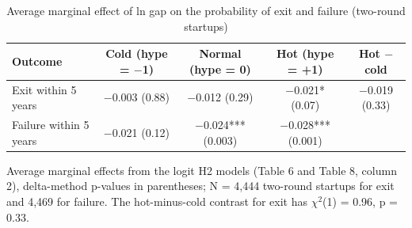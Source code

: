 \begin{table}[tbp]
\centering\footnotesize
\caption{Average marginal effect of ln gap on the probability of exit and failure (two-round startups)}
\label{tab:T7}
\begin{tabular}{lcccc}
\toprule
Outcome & Cold (hype = $-$1) & Normal (hype = 0) & Hot (hype = +1) & Hot $-$ cold \\
\midrule
Exit within 5 years & $-$0.003 (0.88) & $-$0.012 (0.29) & $-$0.021* (0.07) & $-$0.019 (0.33) \\
Failure within 5 years & $-$0.021 (0.12) & $-$0.024*** (0.003) & $-$0.028*** (0.001) &  \\
\bottomrule
\end{tabular}
\par\smallskip\parbox{0.95\linewidth}{\scriptsize Average marginal effects from the logit H2 models (Table 6 and Table 8, column 2), delta-method p-values in parentheses; N = 4,444 two-round startups for exit and 4,469 for failure. The hot-minus-cold contrast for exit has $\chi^2$(1) = 0.96, p = 0.33.}
\end{table}

